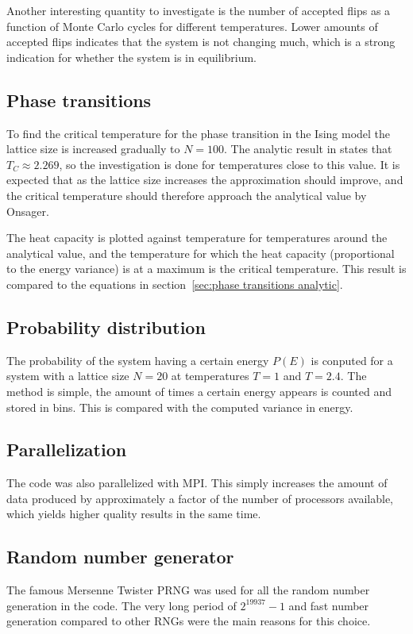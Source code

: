 \documentclass[aps,reprint]{revtex4-1}
\begin{document}
Another interesting quantity to investigate is the number of accepted flips as
a function of Monte Carlo cycles for different temperatures. Lower amounts of
accepted flips indicates that the system is not changing much, which is a strong
indication for whether the system is in equilibrium.
\subsection{Phase transitions} \label{sec:phase transitions}
To find the critical temperature for the phase transition in the Ising model
the lattice size is increased gradually to $N = 100$. The analytic result in
\cite{onsager} states that $T_C \approx 2.269$, so the investigation is done
for temperatures close to this value. It is expected that as the lattice size
increases the approximation should improve, and the critical temperature should
therefore approach the analytical value by Onsager.

The heat capacity is plotted against temperature for temperatures around the
analytical value, and the temperature for which the heat capacity (proportional
to the energy variance) is at a maximum is the critical temperature. This result
is compared to the equations in section~\ref{sec:phase transitions analytic}.

\subsection{Probability distribution}
The probability of the system having a certain energy $P(E)$ is conputed
for a system with a lattice size $N = 20$ at temperatures $T = 1$ and $T = 2.4$.
The method is simple, the amount of times a certain energy appears is counted
and stored in bins. This is compared with the computed variance in energy.

\subsection{Parallelization}
The code was also parallelized with MPI. This simply increases the amount of
data produced by approximately a factor of the number of processors available,
which yields higher quality results in the same time.

\subsection{Random number generator}
The famous Mersenne Twister PRNG was used for all the random number generation
in the code. The very long period of $2^{19937} - 1$ and fast number generation
compared to other RNGs were the main reasons for this choice.
\end{document}
